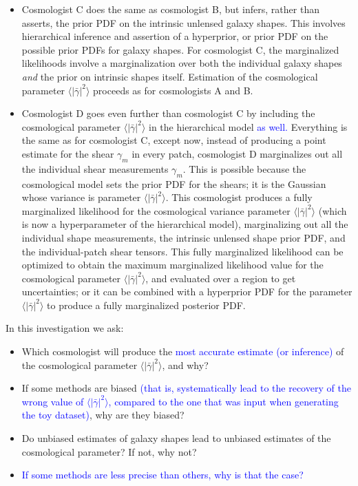 \documentclass[12pt]{article}
\def\shearvar{\langle |\bar{\gamma}|^2\rangle}
\def\phil#1{\textcolor{blue}{#1}}
\begin{document}
\begin{itemize}
\item Cosmologist C does the same as cosmologist B, but infers, rather than
asserts, the prior PDF on the intrinsic unlensed galaxy shapes.  This
involves hierarchical inference and assertion of a hyperprior, or
prior PDF on the possible prior PDFs for galaxy shapes.  For
cosmologist C, the marginalized likelihoods involve a marginalization
over both the individual galaxy shapes \emph{and} the prior on
intrinsic shapes itself.  Estimation of the cosmological parameter
$\shearvar$ proceeds as for cosmologists A and B.

\item Cosmologist D goes even further than cosmologist C by including the
cosmological parameter $\shearvar$ in the hierarchical model \phil{as well.}
Everything is the same as for cosmologist C, except now, instead of
producing a point estimate for the shear $\gamma_m$ in every patch,
cosmologist D marginalizes out all the individual shear measurements
$\gamma_m$.  This is possible because the cosmological model sets the
prior PDF for the shears; it is the Gaussian whose variance is
parameter $\shearvar$.  This cosmologist produces a fully marginalized
likelihood for the cosmological variance parameter $\shearvar$ (which
is now a hyperparameter of the hierarchical model), marginalizing out
all the individual shape measurements, the intrinsic unlensed shape
prior PDF, and the individual-patch shear tensors.  This fully
marginalized likelihood can be optimized to obtain the maximum
marginalized likelihood value for the cosmological parameter
$\shearvar$, and evaluated over a region to get uncertainties; or it
can be combined with a hyperprior PDF for the parameter $\shearvar$ to
produce a fully marginalized posterior PDF.

\end{itemize}

In this investigation we ask:
\begin{itemize}
\item Which cosmologist will produce the \phil{
most accurate estimate (or inference)}
of the cosmological parameter $\shearvar$, and why? 
\item If some methods are biased \phil{(that is, systematically lead to the
recovery of the wrong value of $\shearvar$, compared to the one that was input
when generating the toy dataset)}, why are they biased?  
\item Do unbiased estimates of galaxy shapes lead to unbiased estimates of the
cosmological parameter?  If not, why not?
\item \phil{If some methods are less precise than others, why is that the 
case?}
\end{itemize}
\end{document}
